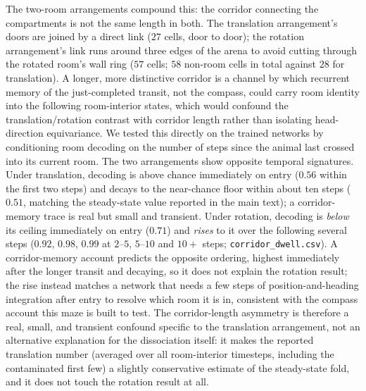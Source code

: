 \documentclass[9pt,lineno]{elife}
\begin{document}
The two-room arrangements compound this: the corridor connecting the compartments is not the same
length in both. The translation arrangement's doors are joined by a direct link ($27$ cells,
door to door); the rotation arrangement's link runs around three edges of the arena to avoid
cutting through the rotated room's wall ring ($57$ cells; $58$ non-room cells in total against
$28$ for translation). A longer, more distinctive corridor is a channel by which recurrent memory
of the just-completed transit, not the compass, could carry room identity into the following
room-interior states, which would confound the translation/rotation contrast with corridor length
rather than isolating head-direction equivariance. We tested this directly on the trained networks
by conditioning room decoding on the number of steps since the animal last crossed into its current
room. The two arrangements show opposite temporal signatures. Under translation, decoding is
above chance immediately on entry ($0.56$ within the first two steps) and decays to the
near-chance floor within about ten steps ($0.51$, matching the steady-state value reported in the
main text); a corridor-memory trace is real but small and transient. Under rotation, decoding is
\emph{below} its ceiling immediately on entry ($0.71$) and \emph{rises} to it over the following
several steps ($0.92$, $0.98$, $0.99$ at $2$--$5$, $5$--$10$ and $10+$ steps; \texttt{corridor\_dwell.csv}).
A corridor-memory account predicts the opposite ordering, highest immediately after the longer
transit and decaying, so it does not explain the rotation result; the rise instead matches a
network that needs a few steps of position-and-heading integration after entry to resolve which
room it is in, consistent with the compass account this maze is built to test. The corridor-length
asymmetry is therefore a real, small, and transient confound specific to the translation
arrangement, not an alternative explanation for the dissociation itself: it makes the reported
translation number (averaged over all room-interior timesteps, including the contaminated first
few) a slightly conservative estimate of the steady-state fold, and it does not touch the rotation
result at all.
\end{document}
